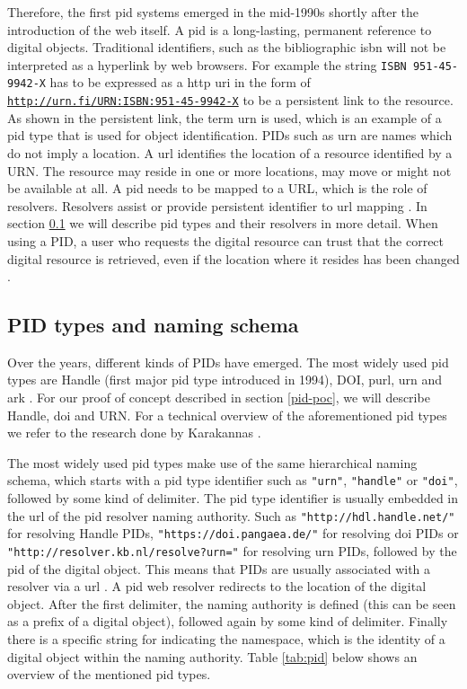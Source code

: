 Therefore, the first \gls{pid} systems emerged in the mid-1990s shortly after the introduction of the web itself. A \gls{pid} is a long-lasting, permanent reference to digital objects. Traditional identifiers, such as the bibliographic \gls{isbn} will not be interpreted as a hyperlink by web browsers. For example the string \texttt{ISBN 951-45-9942-X} has to be expressed as a \gls{http} \gls{uri} in the form of \texttt{\url{http://urn.fi/URN:ISBN:951-45-9942-X}} to be a persistent link to the resource. As shown in the persistent link, the term \gls{urn} is used, which is an example of a \gls{pid} type that is used for object identification. 
PIDs such as \gls{urn} are names which do not imply a location. A \gls{url} identifies the location of a resource identified by a URN. The resource may reside in one or more locations, may move or might not be available at all. A \gls{pid} needs to be mapped to a URL, which is the role of resolvers. Resolvers assist or provide persistent identifier to \gls{url} mapping \cite{rfc1737}. In section \ref{pid-types} we will describe \gls{pid} types and their resolvers in more detail. When using a PID, a user who requests the digital resource can trust that the correct digital resource is retrieved, even if the location where it resides has been changed \cite{pid-oview}.

\subsection{PID types and naming schema}\label{pid-types}
Over the years, different kinds of PIDs have emerged. The most widely used \gls{pid} types are Handle (first major \gls{pid} type introduced in 1994), DOI, \gls{purl}, \gls{urn} and \gls{ark} \cite{pid-oview, odin, hdl}. For our proof of concept described in section \ref{pid-poc}, we will describe Handle, \gls{doi} and URN. For a technical overview of the aforementioned \gls{pid} types we refer to the research done by Karakannas \cite{icn-bd}. 

The most widely used \gls{pid} types make use of the same hierarchical naming schema, which starts with a \gls{pid} type identifier such as \texttt{"urn"}, \texttt{"handle"} or \texttt{"doi"}, followed by some kind of delimiter. The \gls{pid} type identifier is usually embedded in the \gls{url} of the \gls{pid} resolver naming authority. Such as \texttt{"http://hdl.handle.net/"} for resolving Handle PIDs, \texttt{"https://doi.pangaea.de/"} for resolving \gls{doi} PIDs or \texttt{"http://resolver.kb.nl/resolve?urn="} for resolving \gls{urn} PIDs, followed by the \gls{pid} of the digital object. This means that PIDs are usually associated with a resolver via a \gls{url} \cite{ids, icn-bd}. A \gls{pid} web resolver redirects to the location of the digital object. After the first delimiter, the naming authority is defined (this can be seen as a prefix of a digital object), followed again by some kind of delimiter. Finally there is a specific string for indicating the namespace, which is the identity of a digital object within the naming authority. Table \ref{tab:pid} below shows an overview of the mentioned \gls{pid} types. 


